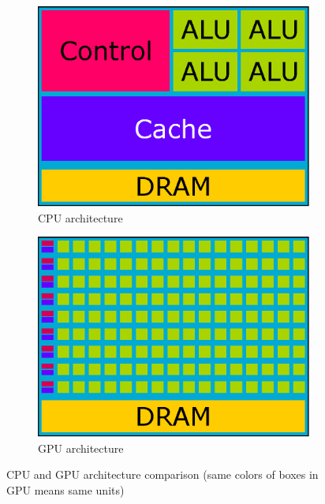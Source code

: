 \begin{figure}[h]
\centering
\begin{subfigure}{.49\textwidth}
  \centering
  \includegraphics[width=1\linewidth]{img/CPUarchitecture.eps}
  \caption{CPU architecture}
  \label{fig:cpuarchitecture}
\end{subfigure}
\begin{subfigure}{.49\textwidth}
  \centering
  \includegraphics[width=1\linewidth]{img/GPUarchitecture.eps}
  \caption{GPU architecture}
  \label{fig:gpuarchitecture}
\end{subfigure}
\caption{CPU and GPU architecture comparison (same colors of boxes in GPU means same units)}
\end{figure}

